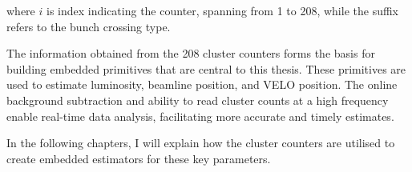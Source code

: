 where $i$ is index indicating the counter, spanning from 1 to 208, while the suffix refers to the bunch crossing type.

The information obtained from the 208 cluster counters forms the basis for building embedded primitives that are central to this thesis. These primitives are used to estimate luminosity, beamline position, and VELO position. The online background subtraction and ability to read cluster counts at a high frequency enable real-time data analysis, facilitating more accurate and timely estimates.

In the following chapters, I will explain how the cluster counters are utilised to create embedded estimators for these key parameters. 
